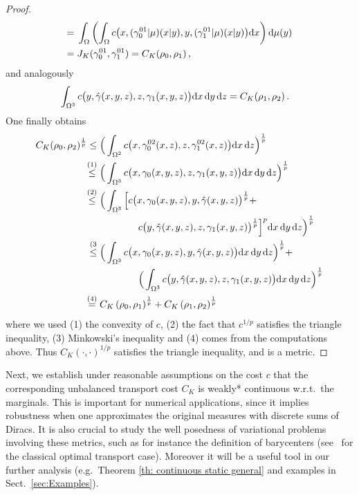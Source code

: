 \begin{proof}
\begin{align*}
= {} &  \int_{\Omega} \left( \int_{\Omega}
	c\big(x,{(\gamma_0^{01}|\mu)}(x|y), y, {(\gamma_1^{01}|\mu)}(x|y)\big)
	\mathrm{d} x \right) \mathrm{d}\mu(y) \\
= {} & J_K(\gamma_0^{01},\gamma_1^{01}) = C_K(\rho_0,\rho_1)\, ,
\end{align*}
and analogously
\begin{align*}
	\int_{\Omega^3} c\big(y,\hat{\gamma}(x,y,z),z,\gamma_1(x,y,z)\big) \mathrm{d} x\,\mathrm{d} y\,\mathrm{d} z & =
	C_K(\rho_1,\rho_2)\,.
\end{align*}
One finally obtains
	\begin{align*}
		 C_K(\rho_0,\rho_2)^{\frac{1}{p}} 
		 \leq {} & \Big(\int_{\Omega^2} c\big(x,\gamma_0^{02}(x,z),z,\gamma_1^{02}(x,z) \big) \mathrm{d} x\,\mathrm{d} z \Big)^{\frac{1}{p}} \\
		\overset{(1)}{\leq} {} & \Big( \int_{\Omega^3} c\big( x, \gamma_0(x,y,z),z, \gamma_1(x,y,z) \big) \mathrm{d} x\,\mathrm{d} y\,\mathrm{d} z \Big)^{\frac{1}{p}} \\
		\overset{(2)}{\leq} {} & 
			\Big( \int_{\Omega^3} 
			\Big[ 
			c\big( x, \gamma_0(x,y,z), y, \hat{\gamma}(x,y,z) \big)^{\frac{1}{p}} + \\
			&\qquad\qquad c\big( y, \hat{\gamma}(x,y,z), z, \gamma_1(x,y,z) \big)^{\frac{1}{p}}
			\Big]^p \mathrm{d} x\,\mathrm{d} y\,\mathrm{d} z 
			\Big)^{\frac{1}{p}} \\
		\overset{(3}{\leq} {} & 
			\Big( \int_{\Omega^3} c\big( x, \gamma_0(x,y,z),y, \hat{\gamma}(x,y,z)\big) \mathrm{d} x\,\mathrm{d} y\,\mathrm{d} z \Big)^{\frac{1}{p}} + \\
			&\qquad\qquad  \Big( \int_{\Omega^3} c\big( y, \hat{\gamma}(x,y,z), z,\gamma_1(x,y,z) \big) \mathrm{d} x\,\mathrm{d} y\,\mathrm{d} z\Big)^{\frac{1}{p}} \\
		\overset{(4)}{=} {} & C_K\left(\rho_0, \rho_1\right)^{\frac{1}{p}} + 
			C_K\left(\rho_1, \rho_2\right)^{\frac{1}{p}} 
		\end{align*}
	where we used (1) the convexity of $c$, (2) the fact that $c^{1/p}$ satisfies the triangle inequality, (3) Minkowski's inequality and (4) comes from the computations above. Thus $C_K(\cdot,\cdot)^{1/p}$ satisfies the triangle inequality, and is a metric. 
\end{proof}


Next, we establish under reasonable assumptions on the cost $c$ that the corresponding unbalanced transport cost $C_K$ is weakly* continuous w.r.t.\ the marginals.
This is important for numerical applications, since it implies robustness when one approximates the original measures with discrete sums of Diracs. It is also crucial to study the well posedness of variational problems involving these metrics, such as for instance the definition of barycenters (see~\cite{Carlier_wasserstein_barycenter} for the classical optimal transport case). 
%
Moreover it will be a useful tool in our further analysis (e.g.~Theorem \ref{th: continuous static general} and examples in Sect.~\ref{sec:Examples}).

